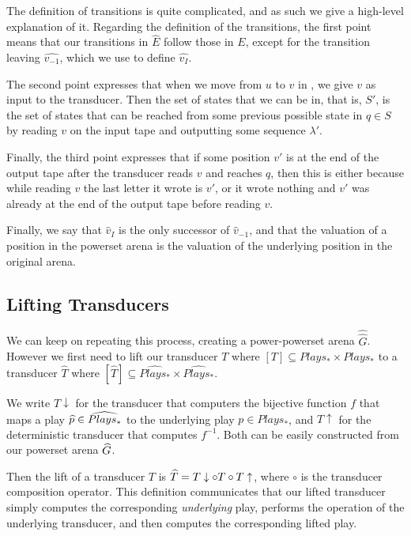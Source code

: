 \documentclass[10pt, a4paper]{report}
\begin{document}
The definition of transitions is quite complicated, and as such we give a high-level
explanation of it. Regarding the definition of the transitions,
the first point means that our transitions in $\widehat{E}$ follow those in $E$,
except for the transition leaving $\widehat{v_{-1}}$, which we use to define
$\widehat{v_I}$. 

The second point expresses that when we move from $u$ to $v$ in , we give
$v$ as input to the transducer. Then the set of states that we can be in, that
is, $S'$, is the set of states that can be reached from some previous possible
state in $q \in S$ by reading $v$ on the input tape and outputting some sequence
$\lambda'$.

Finally, the third point expresses that if some position $v'$ is at the end of
the output tape after the transducer reads $v$ and reaches $q$, then this is either
because while reading $v$ the last letter it wrote is $v'$, or it wrote nothing
and $v'$ was already at the end of the output tape before reading $v$. 

Finally, we say that $\widehat{v}_I$ is the only successor of
$\widehat{v}_{-1}$, and that the valuation of a position in the powerset arena
is the valuation of the underlying position in the original arena. 

\subsection{Lifting Transducers}
\label{sec:LiftingTransducers}

We can keep on repeating this process, creating a power-powerset arena
$\widehat{\widehat{G}}$. However we first need to lift our transducer $T$ where
$[T] \subseteq Plays_\ast \times Plays_\ast$ to a transducer $\widehat{T}$ where
$[\widehat{T}] \subseteq \widehat{Plays_\ast} \times \widehat{Plays_\ast}$.

We write $T\downarrow$ for the transducer that computers the bijective function
$f$ that maps a play $\widehat{p} \in \widehat{Plays_\ast}$ to the underlying play $p
\in Plays_\ast$, and $T\uparrow$ for the deterministic transducer that computes
$f^{-1}$. Both can be easily constructed from our powerset arena $\widehat{G}$.

Then the lift of a transducer $T$ is $\widehat{T} = T\downarrow \circ T \circ
T\uparrow$, where $\circ$ is the transducer composition operator. This
definition communicates that our lifted transducer simply computes the
corresponding \emph{underlying} play, performs the operation of the underlying
transducer, and then computes the corresponding lifted play. 
\end{document}
